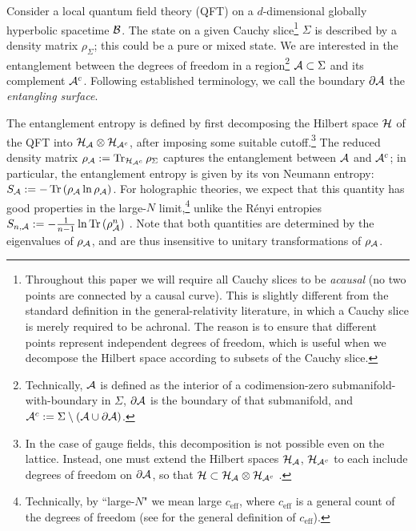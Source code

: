 \documentclass[12pt]{article}
\def\bdy{{\cal B}}
\def\regA{{\cal A}}
\def\regAc{{\cal A}^c}
\def\rhoA{{\rho_{\regA}}}
\def\entsurf{
\partial \regA}
\DeclareMathOperator{\Tr}{Tr}
\begin{document}
Consider a local quantum field theory (QFT) on a $d$-dimensional globally hyperbolic spacetime $\bdy$.  The state on a given Cauchy slice\footnote{ \label{Cauchydef}Throughout this paper we will require all Cauchy slices to be \emph{acausal} (no two points are connected by a causal curve). This is slightly different from the standard definition in the general-relativity literature, in which a Cauchy slice is merely required to be achronal. The reason is to ensure that different points represent independent degrees of freedom, which is useful when we decompose the Hilbert space according to subsets of the Cauchy slice.} $\Sigma$ is described by a density matrix $\rho_\Sigma$; this could be a pure or mixed state.
We are interested in the entanglement 
between the degrees of freedom in a region\footnote{ Technically, $\regA$ is defined as the interior of a codimension-zero submanifold-with-boundary in $\Sigma$, $\partial\regA$ is the boundary of that submanifold, and $\regAc:=\Sigma\setminus(\regA\cup\partial\regA)$.} 
 $\regA \subset \Sigma$ and its complement $\regAc$.  Following established terminology, we call the boundary  $\entsurf$ the {\it entangling surface}. 

The entanglement entropy is defined by first decomposing the Hilbert space ${\cal H}$ of the QFT into ${\cal H}_{\regA} \otimes {\cal H}_{\regAc}$, after imposing some suitable cutoff.\footnote{ In the case of gauge fields, this decomposition is not possible even on the lattice.  Instead, one must extend the Hilbert spaces ${\cal H}_{\regA}$, ${\cal H}_{\regAc}$ to each include degrees of freedom on $\entsurf$, so that ${\cal H} \subset {\cal H}_{\regA} \otimes {\cal H}_{\regAc}$ \cite{Buividovich:2008gq,Donnelly:2011hn,Casini:2013rba,Donnelly:2014gva}.} The reduced density matrix $\rho_{\regA} := \Tr_{{\cal H}_{\regAc}} \rho_\Sigma$ captures the entanglement between $\regA$ and $\regAc$; in particular, the entanglement entropy is given by its von Neumann entropy: $S_{\regA} := - \Tr\left( \rho_{\regA} \ln \rho_{\regA}\right)$. For holographic theories, we expect that this quantity has good properties in the large-$N$ limit,\footnote{ Technically, by ``large-$N$" we mean large $c_\text{eff}$, where 
$c_\text{eff} $ is a general count of the degrees of freedom (see \cite{Marolf:2013ioa} for the general definition of $c_\text{eff}$).} unlike the R\'enyi entropies $S_{n,\regA} := - \frac{1}{n-1} \ln \Tr \left(\rho_{\regA}^n\right)$ \cite{Headrick:2010zt,Headrick:2013zda}. Note that both quantities are determined by the eigenvalues of $\rhoA$, and are thus insensitive to unitary transformations of $\rhoA$.
\end{document}
